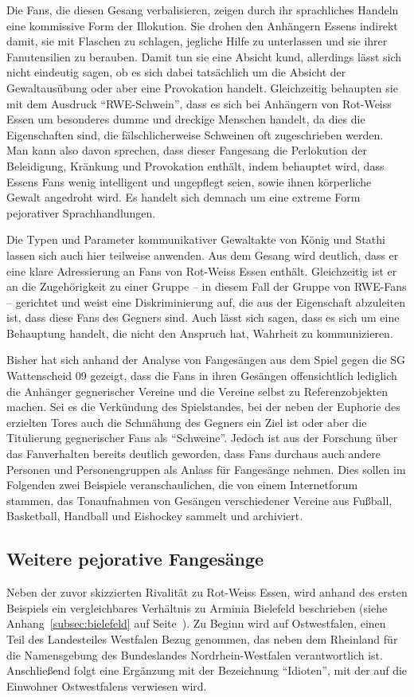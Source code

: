 Die Fans, die diesen Gesang verbalisieren, zeigen durch ihr sprachliches Handeln eine kommissive Form der Illokution.
Sie drohen den Anhängern Essens indirekt damit, sie mit Flaschen zu schlagen, jegliche Hilfe zu unterlassen und sie ihrer Fanutensilien zu berauben.
Damit tun sie eine Absicht kund, allerdings lässt sich nicht eindeutig sagen, ob es sich dabei tatsächlich um die Absicht der Gewaltausübung oder aber eine Provokation handelt.
Gleichzeitig behaupten sie mit dem Ausdruck "`RWE-Schwein"', dass es sich bei Anhängern von Rot-Weiss Essen um besonderes dumme und dreckige Menschen handelt, da dies die Eigenschaften sind, die fälschlicherweise Schweinen oft zugeschrieben werden.
Man kann also davon sprechen, dass dieser Fangesang die Perlokution der Beleidigung, Kränkung und Provokation enthält, indem behauptet wird, dass Essens Fans wenig intelligent und ungepflegt seien, sowie ihnen körperliche Gewalt angedroht wird.
Es handelt sich demnach um eine extreme Form pejorativer Sprachhandlungen.

Die Typen und Parameter kommunikativer Gewaltakte von König und Stathi\cite[S. 50]{EK10} lassen sich auch hier teilweise anwenden.
Aus dem Gesang wird deutlich, dass er eine klare Adressierung an Fans von Rot-Weiss Essen enthält.
Gleichzeitig ist er an die Zugehörigkeit zu einer Gruppe – in diesem Fall der Gruppe von RWE-Fans – gerichtet und weist eine Diskriminierung auf, die aus der Eigenschaft abzuleiten ist, dass diese Fans des Gegners sind.
Auch lässt sich sagen, dass es sich um eine Behauptung handelt, die nicht den Anspruch hat, Wahrheit zu kommunizieren.

Bisher hat sich anhand der Analyse von Fangesängen aus dem Spiel gegen die SG Wattenscheid 09 gezeigt, dass die Fans in ihren Gesängen offensichtlich lediglich die Anhänger gegnerischer Vereine und die Vereine selbst zu Referenzobjekten machen.
Sei es die Verkündung des Spielstandes, bei der neben der Euphorie des erzielten Tores auch die Schmähung des Gegners ein Ziel ist oder aber die Titulierung gegnerischer Fans als "`Schweine"'.
Jedoch ist aus der Forschung über das Fanverhalten bereits deutlich geworden, dass Fans durchaus auch andere Personen und Personengruppen als Anlass für Fangesänge nehmen.
Dies sollen im Folgenden zwei Beispiele veranschaulichen, die von einem Internetforum stammen, das Tonaufnahmen von Gesängen verschiedener Vereine aus Fußball, Basketball, Handball und Eishockey sammelt und archiviert\cite{BT14}.

\subsection{Weitere pejorative Fangesänge}
Neben der zuvor skizzierten Rivalität zu Rot-Weiss Essen, wird anhand des ersten Beispiels ein vergleichbares Verhältnis zu Arminia Bielefeld beschrieben (siehe Anhang~\ref{subsec:bielefeld} auf Seite~\pageref{subsec:bielefeld}).
Zu Beginn wird auf Ostwestfalen, einen Teil des Landesteiles Westfalen Bezug genommen, das neben dem Rheinland für die Namensgebung des Bundeslandes Nordrhein-Westfalen verantwortlich ist.
Anschließend folgt eine Ergänzung mit der Bezeichnung "`Idioten"', mit der auf die Einwohner Ostwestfalens verwiesen wird.

